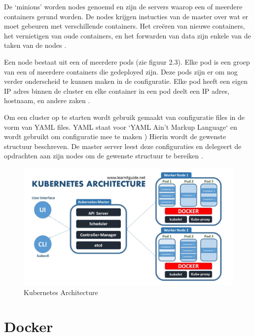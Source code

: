De `minions' worden nodes genoemd en zijn de servers waarop een of meerdere containers gerund worden. De nodes krijgen instucties van de master over wat er moet gebeuren met verschillende containers. Het creëren van nieuwe containers, het vernietigen van oude containers, en het forwarden van data zijn enkele van de taken van de nodes \autocite{ellingwood2018}.

Een node bestaat uit een of meerdere pods (zie figuur 2.3). Elke pod is een groep van een of meerdere containers die gedeployed zijn. Deze pods zijn er om nog verder onderscheid te kunnen maken in de configuratie. Elke pod heeft een eigen IP adres binnen de cluster en elke container in een pod deelt een IP adres, hostnaam, en andere zaken \autocite{learnitguide2018}.

Om een cluster op te starten wordt gebruik gemaakt van configuratie files in de vorm van YAML files. YAML staat voor `YAML Ain't Markup Language` en wordt gebruikt om configuratie mee te maken \autocite{grav}) Hierin wordt de gewenste structuur beschreven. De master server leest deze configuraties en delegeert de opdrachten aan zijn nodes om de gewenste structuur te bereiken \autocite{ellingwood2018}.

\begin{figure}[ht]
    \centering
   \includegraphics[scale=0.4]{img/kubernetes_architecture_explained}
    \caption[Kubernetes Architecture]{Kubernetes Architecture \cite{learnitguide2018}}
\end{figure}

\section{Docker}
\label{sec:docker}

